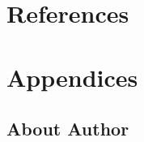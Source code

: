 \documentclass[
]{article}
\begin{document}
\hypertarget{references}{%
\section*{References}\label{references}}

\hypertarget{appendices}{%
\section*{Appendices}\label{appendices}}

\hypertarget{about-author}{%
\subsection*{About Author}\label{about-author}}
\end{document}
